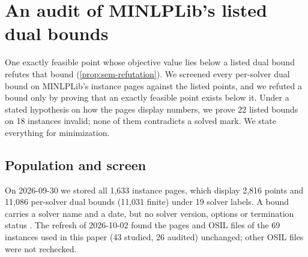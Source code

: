 \section{An audit of MINLPLib's listed dual bounds}\label{sec:audit}

One exactly feasible point whose objective value lies below a listed dual bound refutes that bound (\cref{prop:sem-refutation}).
We screened every per-solver dual bound on MINLPLib's instance pages against the listed points, and we refuted a bound only by proving that an exactly feasible point exists below it.
Under a stated hypothesis on how the pages display numbers, we prove 22 listed bounds on 18 instances invalid; none of them contradicts a solved mark.
We state everything for minimization.

\subsection{Population and screen}\label{sec:audit-screen}

On 2026-09-30 we stored all 1,633 instance pages, which display 2,816 points and 11,086 per-solver dual bounds (11,031 finite) under 19 solver labels.
A bound carries a solver name and a date, but no solver version, options or termination status \citep{vigerske2026-minlplib-a-library-of-mixed}.
The refresh of 2026-10-02 found the pages and OSIL files of the 69 instances used in this paper (43 studied, 26 audited) unchanged; other OSIL files were not rechecked.


